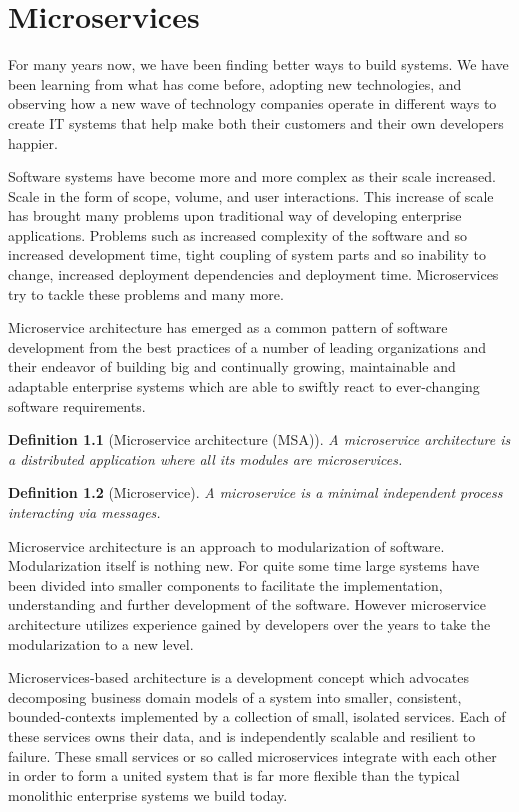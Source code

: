 \documentclass[12pt,oneside]{fithesis2}
\newtheorem{definition}{Definition}
\begin{document}
\chapter{Microservices}

For many years now, we have been finding better ways to build systems. We have been learning from what has come before, adopting new technologies, and observing how a new wave of technology companies operate in different ways to create IT systems that help make both their customers and their own developers happier. \cite{ma}

Software systems have become more and more complex as their scale increased. Scale in the form of scope, volume, and user interactions. This increase of scale has brought many problems upon traditional way of developing enterprise applications. Problems such as increased complexity of the software and so increased development time, tight coupling of system parts and so inability to change, increased deployment dependencies and deployment time. Microservices try to tackle these problems and many more.

Microservice architecture has emerged as a common pattern of software development from the best practices of a number of leading organizations and their endeavor of building big and continually growing, maintainable and adaptable enterprise systems which are able to swiftly react to ever-changing software requirements.

\begin{definition}[Microservice architecture (MSA)]
A microservice architecture is a distributed application where all its modules are microservices. \cite{mytat}
\end{definition}

\begin{definition}[Microservice]
A microservice  is  a  minimal  independent  process  interacting via messages. \cite{mytat}
\end{definition}

Microservice architecture is an approach to modularization of software. Modularization itself is nothing new. For quite some time large systems have been divided into smaller components to facilitate the implementation, understanding and further development of the software. However microservice architecture utilizes experience gained by developers over the years to take the modularization to a new level.

Microservices-based architecture is a development concept which advocates decomposing business domain models of a system into smaller, consistent, bounded-contexts implemented by a collection of small, isolated services. Each of these services owns their data, and is independently scalable and resilient to failure. These small services or so called microservices integrate with each other in order to form a united system that is far more flexible than the typical monolithic enterprise systems we build today. \cite{rma}
\end{document}
